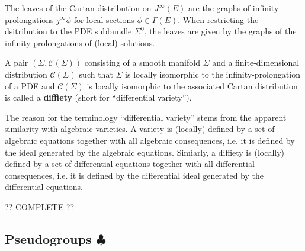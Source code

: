     \begin{property}[Diffiety]\label{var:diffiety}
        The leaves of the Cartan distribution on $J^\infty(E)$ are the graphs of infinity-prolongations $j^\infty\phi$ for local sections $\phi\in\Gamma(E)$. When restricting the dsitribution to the PDE subbundle $\Sigma^0$, the leaves are given by the graphs of the infinity-prolongations of (local) solutions.

        A pair $(\Sigma,\mathcal{C}(\Sigma))$ consisting of a smooth manifold $\Sigma$ and a finite-dimensional distribution $\mathcal{C}(\Sigma)$ such that $\Sigma$ is locally isomorphic to the infinity-prolongation of a PDE and $\mathcal{C}(\Sigma)$ is locally isomorphic to the associated Cartan distribution is called a \textbf{diffiety} (short for ``differential variety'').
    \end{property}
    \begin{remark}
        The reason for the terminology ``differential variety'' stems from the apparent similarity with algebraic varieties. A variety is (locally) defined by a set of algebraic equations together with all algebraic consequences, i.e. it is defined by the ideal generated by the algebraic equations. Simiarly, a diffiety is (locally) defined by a set of differential equations together with all differential consequences, i.e. it is defined by the differential ideal generated by the differential equations.
    \end{remark}

    ?? COMPLETE ??

\subsection{\texorpdfstring{Pseudogroups $\clubsuit$}{Pseudogroups}}

